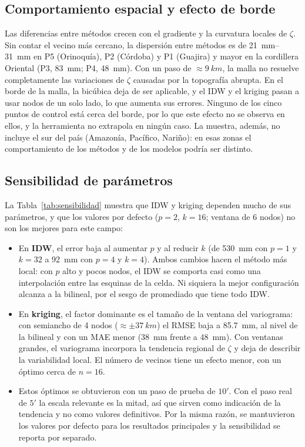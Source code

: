 \documentclass[11pt,letterpaper]{article}
\begin{document}
\subsection{Comportamiento espacial y efecto de borde}
Las diferencias entre métodos crecen con el gradiente y la curvatura locales de $\zeta$. Sin
contar el vecino más cercano, la dispersión entre métodos es de \SIrange{21}{31}{mm} en P5 (Orinoquía),
P2 (Córdoba) y P1 (Guajira) y mayor en la cordillera Oriental (P3, \SI{83}{mm}; P4, \SI{48}{mm}).
Con un paso de $\approx\SI{9}{km}$, la malla no resuelve completamente las variaciones de
$\zeta$ causadas por la topografía abrupta. En el borde de la malla, la bicúbica deja de
ser aplicable, y el IDW y el kriging pasan a usar nodos de un solo lado, lo que aumenta
sus errores. Ninguno de los cinco puntos de control está cerca del borde, por lo que este efecto no
se observa en ellos, y la herramienta no extrapola en ningún caso. La
muestra, además, no incluye el sur del país (Amazonía, Pacífico, Nariño): en esas zonas el
comportamiento de los métodos y de los modelos podría ser distinto.

\subsection{Sensibilidad de parámetros}
La Tabla~\ref{tab:sensibilidad} muestra que IDW y kriging dependen mucho de sus
parámetros, y que los valores por defecto ($p=2$, $k=16$; ventana de 6 nodos) no son los
mejores para este campo:
\begin{itemize}
    \item En \textbf{IDW}, el error baja al aumentar $p$ y al reducir $k$ (de \SI{530}{mm}
    con $p=1$ y $k=32$ a \SI{92}{mm} con $p=4$ y $k=4$). Ambos cambios hacen el método más
    local: con $p$ alto y pocos nodos, el IDW se comporta casi como una interpolación entre
    las esquinas de la celda. Ni siquiera la mejor configuración alcanza a la bilineal, por
    el sesgo de promediado que tiene todo IDW.
    \item En \textbf{kriging}, el factor dominante es el tamaño de la ventana del
    variograma: con semiancho de 4 nodos ($\approx\pm\SI{37}{km}$) el RMSE baja a
    \SI{85.7}{mm}, al nivel de la bilineal y con un MAE menor (\SI{38}{mm} frente a
    \SI{48}{mm}). Con ventanas grandes, el variograma incorpora la tendencia regional de
    $\zeta$ y deja de describir la variabilidad local. El número de vecinos tiene un efecto
    menor, con un óptimo cerca de $n=16$.
    \item Estos óptimos se obtuvieron con un paso de prueba de $10'$. Con el paso real de
    $5'$ la escala relevante es la mitad, así que sirven como indicación de la tendencia y no
    como valores definitivos. Por la misma razón, se mantuvieron los valores por defecto para
    los resultados principales y la sensibilidad se reporta por separado.
\end{itemize}
\end{document}
